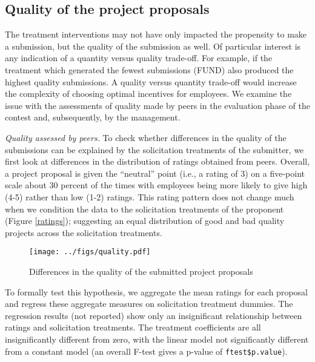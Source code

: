 \documentclass[11pt, titlepage]{article}
\begin{document}
\subsection{Quality of the project
proposals}\label{quality-of-the-project-proposals}

The treatment interventions may not have only impacted the propensity to
make a submission, but the quality of the submission as well. Of
particular interest is any indication of a quantity versus quality
trade-off. For example, if the treatment which generated the fewest
submissions (FUND) also produced the highest quality submissions. A
quality versus quantity trade-off would increase the complexity of
choosing optimal incentives for employees. We examine the issue with the
assessments of quality made by peers in the evaluation phase of the
contest and, subsequently, by the management.

\emph{Quality assessed by peers.} To check whether differences in the
quality of the submissions can be explained by the solicitation
treatments of the submitter, we first look at differences in the
distribution of ratings obtained from peers. Overall, a project proposal
is given the ``neutral'' point (i.e., a rating of 3) on a five-point
scale about 30 percent of the times with employees being more likely to
give high (4-5) rather than low (1-2) ratings. This rating pattern does
not change much when we condition the data to the solicitation
treatments of the proponent (Figure \ref{ratings}); suggesting an equal
distribution of good and bad quality projects across the solicitation
treatments.

\begin{figure}
\centering
\caption{Differences in the quality of the submitted project proposals}
\label{fig: quality}
\texttt{[image: ../figs/quality.pdf]}
\end{figure}

To formally test this hypothesis, we aggregate the mean ratings for each
proposal and regress these aggregate measures on solicitation treatment
dummies. The regression results (not reported) show only an
insignificant relationship between ratings and solicitation treatments.
The treatment coefficients are all insignificantly different from zero,
with the linear model not significantly different from a constant model
(an overall F-test gives a p-value of \texttt{ftest\$p.value}).
\end{document}
